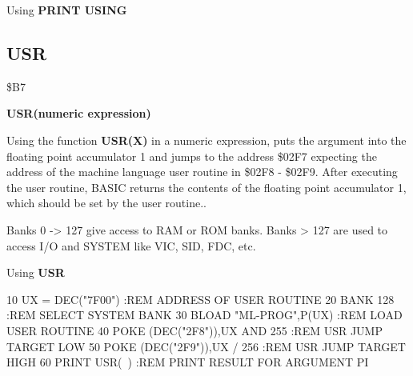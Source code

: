 \begin{description}[leftmargin=3cm,style=nextline]
\item [Example:] Using {\bf PRINT USING}

\end{description}


\newpage
\subsection{USR}
\begin{description}[leftmargin=3cm,style=nextline]
\item [Token:] \$B7
\item [Format:] {\bf USR(numeric expression)}
\item [Usage:]  Using the function {\bf USR(X)} in a numeric
                expression, puts the argument into the
                floating point accumulator 1 and jumps to the
                address \$02F7 expecting the address of the
                machine language user routine in \$02F8 - \$02F9.
                After executing the user routine, BASIC returns
                the contents of the floating point accumulator 1,
                which should be set by the user routine..

\item [Remarks:] Banks 0 -> 127 give access to RAM or ROM banks.
                 Banks > 127 are used to access I/O and SYSTEM
                 like VIC, SID, FDC, etc.
\item [Example:] Using {\bf USR}

\begin{screenoutput}
 10 UX = DEC("7F00")             :REM ADDRESS OF USER ROUTINE
 20 BANK 128                     :REM SELECT SYSTEM BANK
 30 BLOAD "ML-PROG",P(UX)        :REM LOAD USER ROUTINE
 40 POKE (DEC("2F8")),UX AND 255 :REM USR JUMP TARGET LOW
 50 POKE (DEC("2F9")),UX / 256   :REM USR JUMP TARGET HIGH
 60 PRINT USR(~)                 :REM PRINT RESULT FOR ARGUMENT PI
\end{screenoutput}
\end{description}

